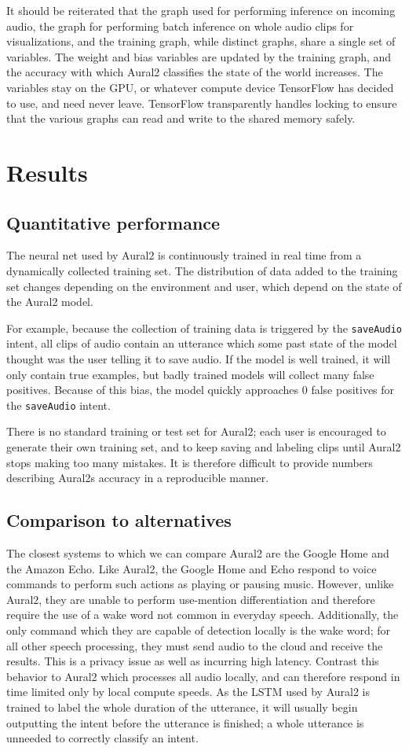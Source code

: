 \documentclass[conference]{IEEEtran}
\begin{document}
It should be reiterated that the graph used for performing inference on
incoming audio, the graph for performing batch inference on whole audio
clips for visualizations, and the training graph, while distinct graphs,
share a single set of variables. The weight and bias variables are
updated by the training graph, and the accuracy with which Aural2
classifies the state of the world increases. The variables stay on the
GPU, or whatever compute device TensorFlow has decided to use, and need
never leave. TensorFlow transparently handles locking to ensure that the
various graphs can read and write to the shared memory safely.

\section{Results}
\subsection{Quantitative performance}
The neural net used by Aural2 is continuously trained in real time from a dynamically collected training set.
The distribution of data added to the training set changes depending on the environment and user, which depend on the state of the Aural2 model.

For example, because the collection of training data is triggered by the \texttt{saveAudio} intent,
all clips of audio contain an utterance which some past state of the model thought was the user telling it to save audio.
If the model is well trained, it will only contain true examples, but badly trained models will collect many false positives.
Because of this bias, the model quickly approaches 0 false positives for the \texttt{saveAudio} intent.

There is no standard training or test set for Aural2; each user is
encouraged to generate their own training set, and to keep saving and
labeling clips until Aural2 stops making too many mistakes.
It is therefore difficult to provide numbers describing Aural2s accuracy in a reproducible manner.

\subsection{Comparison to alternatives}
The closest systems to which we can compare Aural2 are the Google Home and the Amazon Echo.
Like Aural2, the Google Home and Echo respond to voice commands to perform such actions as playing or pausing music.
However, unlike Aural2, they are unable to perform use-mention differentiation and therefore require the use of a wake word not common in everyday speech.
Additionally, the only command which they are capable of detection locally is the wake word;
for all other speech processing, they must send audio to the cloud and receive the results.
This is a privacy issue as well as incurring high latency.
Contrast this behavior to Aural2 which processes all audio locally, and can therefore
respond in time limited only by local compute speeds.
As the LSTM used by Aural2 is trained to label the whole duration of the utterance,
it will usually begin outputting the intent before the utterance is finished; a whole utterance is unneeded to correctly classify an intent.
\end{document}
